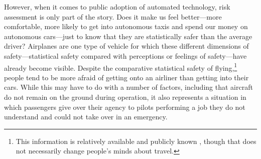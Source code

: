 

However, when it comes to public adoption of automated technology,
risk assessment is only part of the story. Does it make us feel better---more
comfortable, more likely to get into autonomous taxis and spend our
money on autonomous cars---just to know that they are statistically safer
than the average driver? Airplanes are one type of vehicle for which
these different dimensions of 
safety---statistical safety compared with perceptions or feelings of
safety---have already become visible. Despite the comparative
statistical safety of flying,\footnote{This information is relatively
  available and publicly known \cite{airlinereporter}, though that does not
  necessarily change people's minds about travel.}
people tend to be more afraid of getting onto an airliner than getting into their
cars. While this may have to do with a number of factors,
including that aircraft do not remain on the ground during operation,
it also represents a situation in which passengers give over their
agency to pilots performing a job they do not understand and could not
take over in an emergency.


